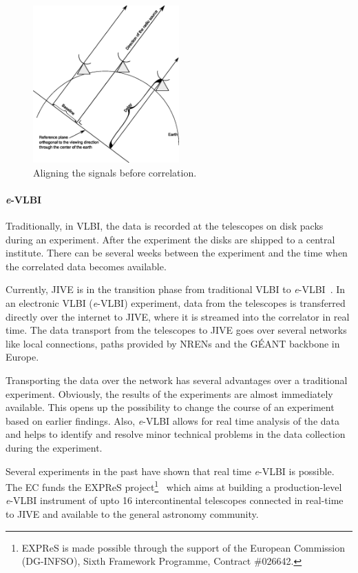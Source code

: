 \begin{figure}
  \centering 
  \includegraphics[width=0.5\textwidth]{img/VLBI.eps}
  \caption{Aligning the signals before correlation.}
  \label{fig:correlation_diagram}
\end{figure}

\paragraph{{\it e}-VLBI}
Traditionally, in VLBI, the data is recorded at the telescopes on disk
packs during an experiment. After the experiment the disks are shipped
to a central institute. There can be several weeks between the
experiment and the time when the correlated data becomes available.

Currently, JIVE is in the transition phase from traditional VLBI to
{\it e}-VLBI~\cite{szomoru-2004}. In an electronic VLBI ({\it e}-VLBI)
experiment, data from the telescopes is transferred directly over the
internet to JIVE, where it is streamed into the correlator in real
time. The data transport from the telescopes to JIVE goes over several
networks like local connections, paths provided by NRENs and the
G\'EANT backbone in Europe.

Transporting the data over the network has several advantages over a
traditional experiment. Obviously, the results of the experiments are
almost immediately available. This opens up the possibility to change
the course of an experiment based on earlier findings. Also, {\it
  e}-VLBI allows for real time analysis of the data and helps to
identify and resolve minor technical problems in the data collection
during the experiment.

Several experiments in the past have shown that real time {\it e}-VLBI
is possible. The EC funds the EXPReS project\footnote{EXPReS is made
  possible through the support of the European Commission (DG-INFSO),
  Sixth Framework Programme, Contract \#026642.}~\cite{EXPReS} which
aims at building a production-level {\it e}-VLBI instrument of upto 16
intercontinental telescopes connected in real-time to JIVE and
available to the general astronomy community.

